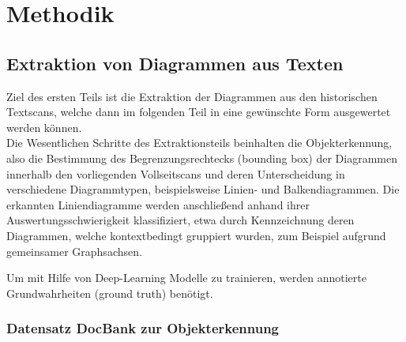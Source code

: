 \chapter{Methodik}
\label{ch:methodik}

\section{Extraktion von Diagrammen aus Texten}

Ziel des ersten Teils ist die Extraktion der Diagrammen aus den historischen Textscans, welche dann im folgenden Teil in eine gewünschte Form ausgewertet werden können.
\\
Die Wesentlichen Schritte des Extraktionsteils beinhalten die Objekterkennung, also die Bestimmung des Begrenzungsrechtecks (bounding box) der Diagrammen innerhalb den vorliegenden Vollseitscans und deren Unterscheidung in verschiedene Diagrammtypen, beispielsweise Linien- und Balkendiagrammen.
Die erkannten Liniendiagramme werden anschließend anhand ihrer Auswertungsschwierigkeit klassifiziert, etwa durch Kennzeichnung deren Diagrammen, welche kontextbedingt gruppiert wurden, zum Beispiel aufgrund gemeinsamer Graphsachsen.

Um mit Hilfe von Deep-Learning Modelle zu trainieren, werden annotierte Grundwahrheiten (ground truth) benötigt.

\subsection{Datensatz DocBank zur Objekterkennung}


